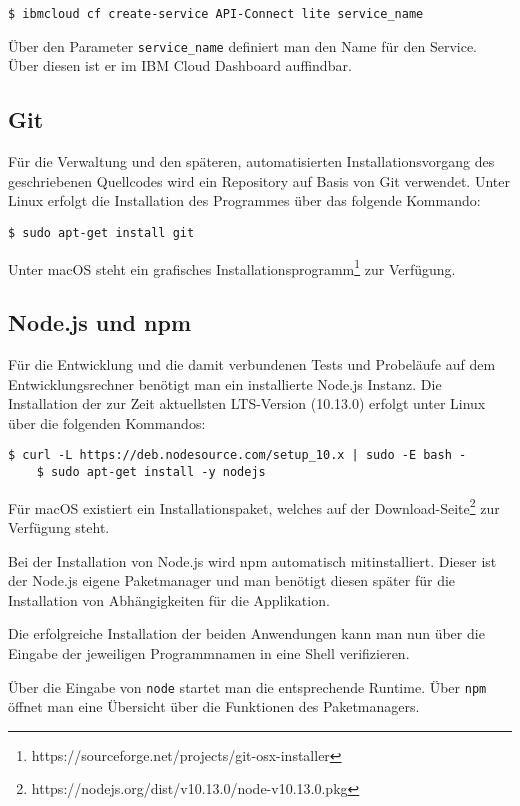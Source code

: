 \begin{lstlisting}[caption=Instanziierung von API Connect, label=ls:vorbereitung_apiconnect]
$ ibmcloud cf create-service API-Connect lite service_name
\end{lstlisting}

Über den Parameter \texttt{service\_name} definiert man den Name für den Service. Über diesen ist er im IBM Cloud
Dashboard auffindbar.

\subsection{Git}
Für die Verwaltung und den späteren, automatisierten Installationsvorgang des geschriebenen Quellcodes wird ein
Repository auf Basis von Git verwendet. Unter Linux erfolgt die Installation des Programmes über das folgende Kommando:

\begin{lstlisting}[caption=Installation von Git, label=ls:vorbereitung_git]
    $ sudo apt-get install git
\end{lstlisting}

Unter macOS steht ein grafisches Installationsprogramm\footnote{https://sourceforge.net/projects/git-osx-installer} zur
Verfügung.

\subsection{Node.js und npm}
Für die Entwicklung und die damit verbundenen Tests und Probeläufe auf dem Entwicklungsrechner benötigt man ein
installierte Node.js Instanz. Die Installation der zur Zeit aktuellsten LTS-Version (10.13.0) erfolgt unter Linux über
die folgenden Kommandos:

\begin{lstlisting}[caption=Installation von Node.js und npm, label=ls:vorbereitung_nodejs]
    $ curl -L https://deb.nodesource.com/setup_10.x | sudo -E bash -
    $ sudo apt-get install -y nodejs
\end{lstlisting}

Für macOS existiert ein Installationspaket, welches auf der
Download-Seite\footnote{https://nodejs.org/dist/v10.13.0/node-v10.13.0.pkg} zur Verfügung steht.

Bei der Installation von Node.js wird npm automatisch mitinstalliert. Dieser ist der Node.js eigene Paketmanager und
man benötigt diesen später für die Installation von Abhängigkeiten für die Applikation.

Die erfolgreiche Installation der beiden Anwendungen kann man nun über die Eingabe der jeweiligen Programmnamen in eine
Shell verifizieren.

Über die Eingabe von \texttt{node} startet man die entsprechende Runtime. Über \texttt{npm} öffnet man eine Übersicht
über die Funktionen des Paketmanagers.